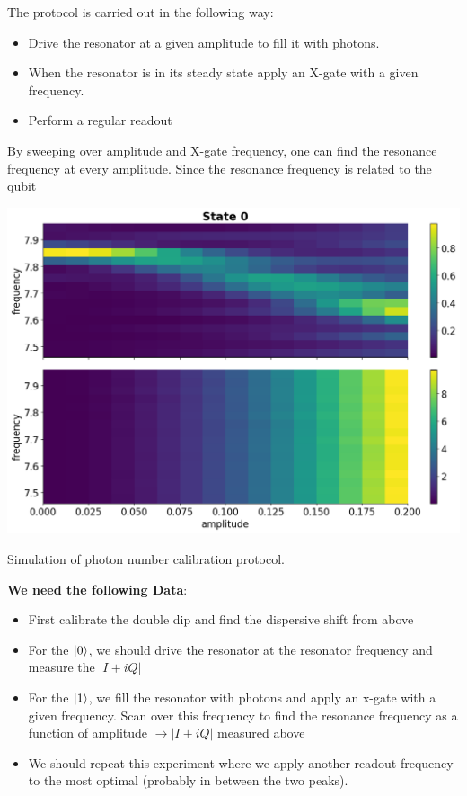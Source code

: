 The protocol is carried out in the following way:
\begin{itemize}
    \item Drive the resonator at a given amplitude to fill it with photons.
    \item When the resonator is in its steady state apply an X-gate with a given frequency.
    \item Perform a regular readout
\end{itemize}
By sweeping over amplitude and X-gate frequency, one can find the resonance frequency at every amplitude. Since the resonance frequency is related to the qubit \\

\begin{marginfigure}[- 5 cm]
    \centering
    \includegraphics[width = 1.3 \textwidth]{tex/fig_for_text/section_6/photon_number_calibration.png}
    \caption{Simulation of photon number calibration protocol.  }
    \label{fig:photon_number_calibration}
\end{marginfigure}

\noindent
\textbf{We need the following Data}:
\begin{itemize}
    \item First calibrate the double dip and find the dispersive shift from above
    \item For the $\ket{0}$, we should drive the resonator at the resonator frequency and measure the $|I + iQ|$
    \item For the $\ket{1}$, we fill the resonator with photons and apply an x-gate with a given frequency. Scan over this frequency to find the resonance frequency as a function of amplitude $\to |I + iQ|$ measured above
    \item We should repeat this experiment where we apply another readout frequency to the most optimal (probably in between the two peaks). 
\end{itemize}

